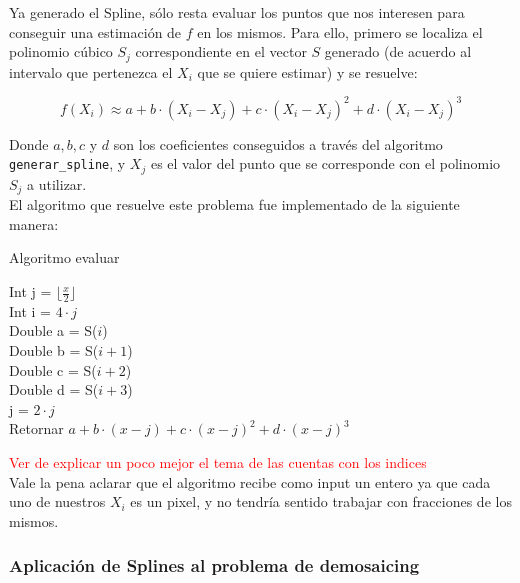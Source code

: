 \documentclass[a4paper]{article}
\begin{document}
Ya generado el Spline, sólo resta evaluar los puntos que nos interesen para conseguir una estimación de $f$ en los mismos. Para ello, primero se localiza el polinomio cúbico $S_j$ correspondiente en el vector $S$ generado (de acuerdo al intervalo que pertenezca el $X_i$ que se quiere estimar) y se resuelve:

\[f(X_i) \approx a+b\cdot (X_i - X_j)+c \cdot (X_i - X_j)^{2} + d \cdot (X_i - X_j)^{3}\]

\bigskip
Donde $a, b, c$ y $d$ son los coeficientes conseguidos a través del algoritmo \texttt{generar_spline}, y $X_j$ es el valor del punto que se corresponde con el polinomio $S_j$ a utilizar. \\
\indent El algoritmo que resuelve este problema fue implementado de la siguiente manera:

\IncMargin{1em}
\begin{algorithm}[h!]
\NoCaptionOfAlgo
\caption{Algoritmo evaluar}

\bigskip

Int j = $\lfloor \frac{x}{2} \rfloor$ \\
Int i = $4 \cdot j$ \\
\bigskip
Double a = S($i$)\\
Double b = S($i+1$)\\
Double c = S($i+2$)\\
Double d = S($i+3$)\\
\bigskip
j = $2 \cdot j$\\
\bigskip
Retornar $a+b\cdot (x - j)+c \cdot (x - j)^{2} + d \cdot (x - j)^{3}$
\end{algorithm}\DecMargin{1em}

\bigskip
\textcolor{red}{Ver de explicar un poco mejor el tema de las cuentas con los indices\\}
Vale la pena aclarar que el algoritmo recibe como input un entero ya que cada uno de nuestros $X_i$ es un pixel, y no tendría sentido trabajar con fracciones de los mismos. \\

\subsubsection*{Aplicación de Splines al problema de demosaicing}
\end{document}
